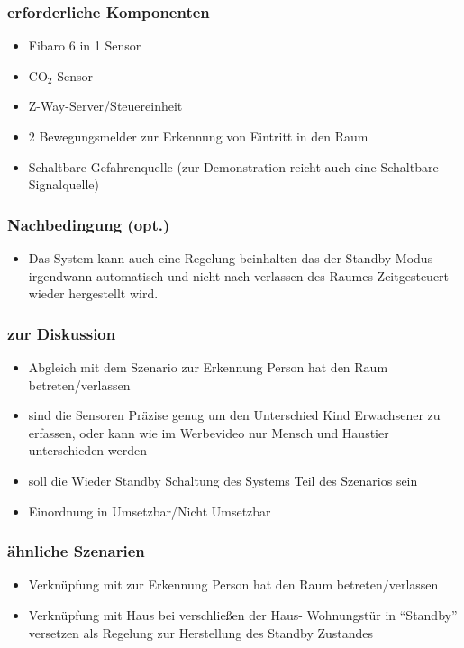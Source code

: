 \subsubsection{erforderliche Komponenten}
\begin{itemize}
	\item Fibaro 6 in 1 Sensor
	\item CO$_2$ Sensor
	\item Z-Way-Server/Steuereinheit
	\item 2 Bewegungsmelder zur Erkennung von Eintritt in den Raum
	\item Schaltbare Gefahrenquelle (zur Demonstration reicht auch eine Schaltbare Signalquelle)
\end{itemize}

\subsubsection{Nachbedingung (opt.)}
\begin{itemize}
	\item Das System kann auch eine Regelung beinhalten das der Standby Modus irgendwann automatisch und nicht nach verlassen des Raumes Zeitgesteuert wieder hergestellt wird.
\end{itemize}

\subsubsection{zur Diskussion}
\begin{itemize}
	\item Abgleich mit dem Szenario zur Erkennung  Person hat den Raum betreten/verlassen
	\item sind die Sensoren Präzise genug um den Unterschied Kind Erwachsener zu erfassen, oder kann wie im Werbevideo nur Mensch und Haustier unterschieden werden
	\item soll die Wieder Standby Schaltung des Systems Teil des Szenarios sein
	\item Einordnung in Umsetzbar/Nicht Umsetzbar
\end{itemize}

\subsubsection{ähnliche Szenarien}
\begin{itemize}
	\item Verknüpfung mit zur Erkennung  Person hat den Raum betreten/verlassen
	\item Verknüpfung mit Haus bei verschließen der Haus- Wohnungstür in "`Standby"' versetzen als Regelung zur Herstellung des Standby Zustandes
\end{itemize}


